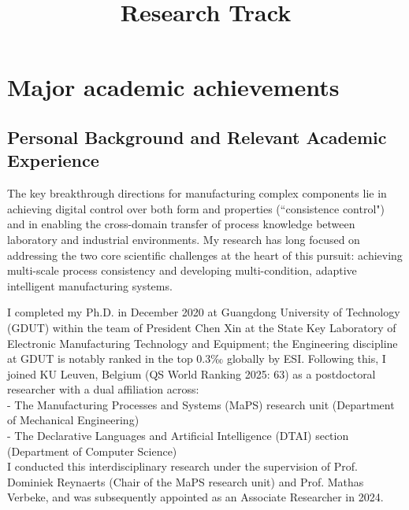\documentclass{ResearchStatement}
\author{ }
\begin{document}
\title {Research Track}
\date{}
\maketitle





\nocite{*}

\section{Major academic achievements}
\subsection{Personal Background and Relevant Academic Experience}
The key breakthrough directions for manufacturing complex components lie in achieving digital control over both form and properties (``consistence control") and in enabling the cross-domain transfer of process knowledge between laboratory and industrial environments. My research has long focused on addressing the two core scientific challenges at the heart of this pursuit: achieving multi-scale process consistency and developing multi-condition, adaptive intelligent manufacturing systems.

I completed my Ph.D. in December 2020 at Guangdong University of Technology (GDUT) within the team of President Chen Xin at the State Key Laboratory of Electronic Manufacturing Technology and Equipment; the Engineering discipline at GDUT is notably ranked in the top 0.3‰ globally by ESI. Following this, I joined KU Leuven, Belgium (QS World Ranking 2025: 63) as a postdoctoral researcher with a dual affiliation across:\\
- The Manufacturing Processes and Systems (MaPS) research unit (Department of Mechanical Engineering)\\
- The Declarative Languages and Artificial Intelligence (DTAI) section (Department of Computer Science)\\
I conducted this interdisciplinary research under the supervision of Prof. Dominiek Reynaerts (Chair of the MaPS research unit) and Prof. Mathas Verbeke, and was subsequently appointed as an Associate Researcher in 2024.
\end{document}
